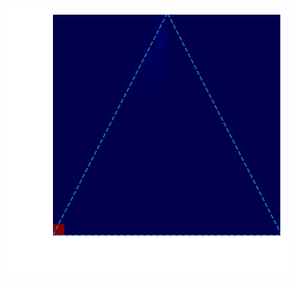\begin{figure}
\begin{minipage}{.3\textwidth}
\subcaption{}
\end{minipage}
 \begin{minipage}{.3\textwidth}
    \includegraphics[width=\textwidth]{triangle_0_2overfit.png}
\subcaption{}
\end{minipage}


\end{figure}
